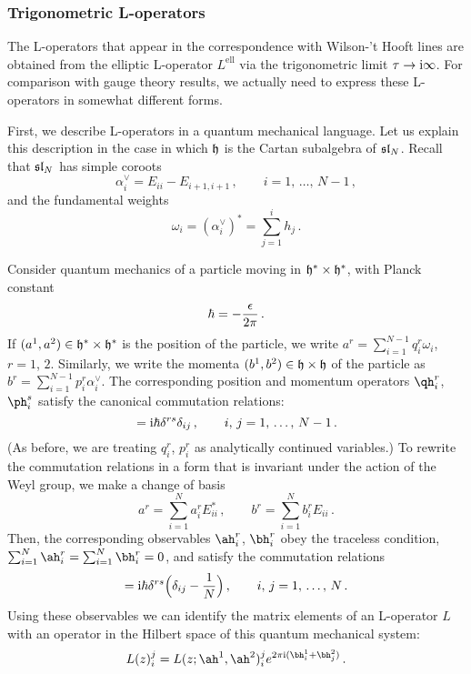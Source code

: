 \subsubsection{Trigonometric L-operators}


The L-operators that appear in the correspondence with Wilson-'t
Hooft lines are obtained from the elliptic L-operator $L^{\text{ell}}$
via the trigonometric limit $\tau \to \mathrm{i}\infty$.  For comparison with
gauge theory results, we actually need to express these L-operators in
somewhat different forms.

First, we describe L-operators in a quantum mechanical language.  Let
us explain this description in the case in which $\mathfrak{h}$ is the Cartan
subalgebra of $\mathfrak{sl}_N$.  Recall that $\mathfrak{sl}_N$ has simple coroots
\begin{equation}
  \alpha^\vee_i = E_{ii} - E_{i+1,i+1} \,,
  \qquad
  i = 1, \, \dotsc, \, N-1 \,,
\end{equation}
and the fundamental weights
\begin{equation}
  \omega_i = (\alpha^\vee_i)^* = \sum_{j=1}^i h_j \,.
\end{equation}

Consider quantum mechanics of a particle moving in
$\mathfrak{h}^* \times \mathfrak{h}^*$, with Planck constant
\begin{equation}
  \hbar = -\frac{\epsilon}{2\pi} \,.
\end{equation}
If $(a^1,a^2) \in \mathfrak{h}^* \times \mathfrak{h}^*$ is the position of the particle,
we write $a^r = \sum_{i=1}^{N-1} q^r_i \omega_i$, $r = 1$, $2$.
Similarly, we write the momenta $(b^1, b^2) \in \mathfrak{h} \times \mathfrak{h}$ of the
particle as $b^r = \sum_{i=1}^{N-1} p^r_i \alpha^\vee_i$.  The
corresponding position and momentum operators $\qh^r_i$, $\ph^s_i$
satisfy the canonical commutation relations:
\begin{equation}
  [\qh_i^r, \ph_j^s] = \iu\hbar \delta^{rs} \delta_{ij} \,,
  \qquad
  i, \, j = 1, \, \dotsc, \, N-1 \,.
\end{equation}
(As before, we are treating $q^r_i$, $p^r_i$ as analytically continued
variables.)
To rewrite the commutation relations in a form that is invariant under
the action of the Weyl group, we make a change of basis
\begin{equation}
  a^r = \sum_{i=1}^N a^r_i E_{ii}^* \,,
  \qquad
  b^r = \sum_{i=1}^N b^r_i E_{ii} \,.
\end{equation}
Then, the corresponding observables $\ah^r_i$, $\bh^r_i$ obey the
traceless condition,
$\sum_{i=1}^N \ah^r_i = \sum_{i=1}^N \bh^r_i = 0$, and satisfy the
commutation relations
\begin{equation}
  [\ah_i^r, \bh_j^s]
  = \iu\hbar \delta^{rs} \Bigl(\delta_{ij} - \frac{1}{N}\Bigr) \,,
  \qquad
  i, \, j = 1, \, \dotsc, \, N \,.
\end{equation}
Using these observables we can identify the matrix elements of an
L-operator $L$ with an operator in the Hilbert space of this quantum
mechanical system:
\begin{equation}
  \label{eq:L-in-QM}
  L(z)_i^j
  = L(z; \ah^1, \ah^2)_i^j e^{2\pi\iu(\bh_i^1 + \bh_j^2)} \,.
\end{equation}

